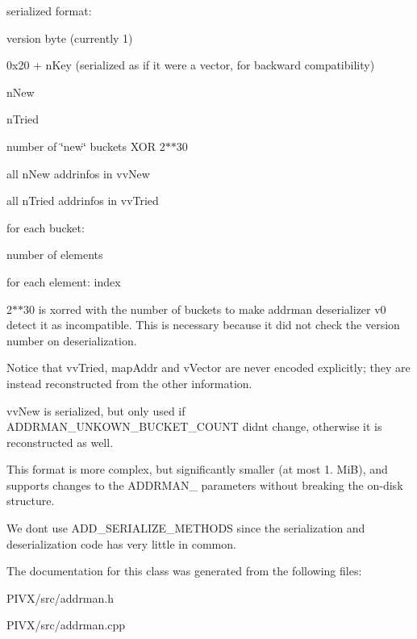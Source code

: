 serialized format\+:
\begin{DoxyItemize}
\item version byte (currently 1)
\item 0x20 + n\+Key (serialized as if it were a vector, for backward compatibility)
\item n\+New
\item n\+Tried
\item number of \char`\"{}new\char`\"{} buckets X\+OR 2$\ast$$\ast$30
\item all n\+New addrinfos in vv\+New
\item all n\+Tried addrinfos in vv\+Tried
\item for each bucket\+:
\begin{DoxyItemize}
\item number of elements
\item for each element\+: index
\end{DoxyItemize}
\end{DoxyItemize}

2$\ast$$\ast$30 is xorred with the number of buckets to make addrman deserializer v0 detect it as incompatible. This is necessary because it did not check the version number on deserialization.

Notice that vv\+Tried, map\+Addr and v\+Vector are never encoded explicitly; they are instead reconstructed from the other information.

vv\+New is serialized, but only used if A\+D\+D\+R\+M\+A\+N\+\_\+\+U\+N\+K\+O\+W\+N\+\_\+\+B\+U\+C\+K\+E\+T\+\_\+\+C\+O\+U\+NT didn\textquotesingle{}t change, otherwise it is reconstructed as well.

This format is more complex, but significantly smaller (at most 1. MiB), and supports changes to the A\+D\+D\+R\+M\+A\+N\+\_\+ parameters without breaking the on-\/disk structure.

We don\textquotesingle{}t use A\+D\+D\+\_\+\+S\+E\+R\+I\+A\+L\+I\+Z\+E\+\_\+\+M\+E\+T\+H\+O\+DS since the serialization and deserialization code has very little in common. 

The documentation for this class was generated from the following files\+:\begin{DoxyCompactItemize}
\item 
P\+I\+V\+X/src/addrman.\+h\item 
P\+I\+V\+X/src/addrman.\+cpp\end{DoxyCompactItemize}
